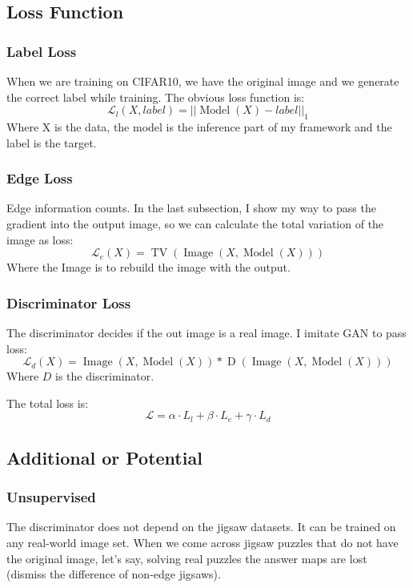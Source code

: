 \documentclass[conference]{IEEEtran}
\begin{document}
	\subsection{Loss Function}
	\subsubsection{Label Loss}
	When we are training on CIFAR10, we have the original image and we generate the correct label while training. The obvious loss function is:
	\begin{equation}
		\mathcal L_l (X, label) = ||\operatorname{Model}(X) - label||_1
	\end{equation}
	Where X is the data, the model is the inference part of my framework and the label is the target.
	\subsubsection{Edge Loss}
	Edge information counts. In the last subsection, I show my way to pass the gradient into the output image, so we can calculate the total variation of the image as loss:
	\begin{equation}
		\mathcal L_e (X) = \operatorname{TV}(\operatorname{Image}(X, \operatorname{Model}(X)))
	\end{equation} 
	Where the Image is to rebuild the image with the output. 
	\subsubsection{Discriminator Loss}
	The discriminator decides if the out image is a real image. I imitate GAN to pass loss:
	\begin{equation}
		\mathcal L_d (X) = \operatorname{Image}(X, \operatorname{Model}(X)) * \operatorname{D}(\operatorname{Image}(X, \operatorname{Model}(X)))
	\end{equation}
	Where $D$ is the discriminator. 
	
	The total loss is:
	\begin{equation}
		\mathcal L = \alpha\cdot L_l+\beta\cdot L_e+\gamma\cdot L_d
	\end{equation}
	\subsection{Additional or Potential}
	\subsubsection{Unsupervised}
	The discriminator does not depend on the jigsaw datasets. It can be trained on any real-world image set. When we come across jigsaw puzzles that do not have the original image, let's say, solving real puzzles the answer maps are lost (dismiss the difference of non-edge jigsaws). 
\end{document}
